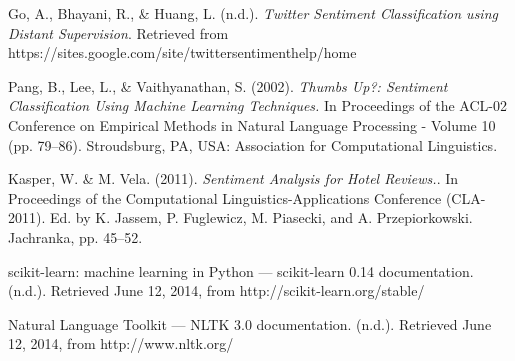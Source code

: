 \documentclass{article}
\begin{document}
\begin{thebibliography}{1}

Go, A., Bhayani, R., \& Huang, L. (n.d.). \textit{Twitter Sentiment Classification using Distant Supervision}. Retrieved from https://sites.google.com/site/twittersentimenthelp/home

Pang, B., Lee, L., \& Vaithyanathan, S. (2002). \textit{Thumbs Up?: Sentiment Classification Using Machine Learning Techniques.} In Proceedings of the ACL-02 Conference on Empirical Methods in Natural Language Processing - Volume 10 (pp. 79–86). Stroudsburg, PA, USA: Association for Computational Linguistics.

Kasper, W. \& M. Vela. (2011). \textit{Sentiment Analysis for Hotel Reviews.}. In Proceedings of the Computational Linguistics-Applications Conference (CLA-2011). Ed. by K. Jassem, P. Fuglewicz, M. Piasecki, and A. Przepiorkowski. Jachranka, pp. 45–52.

scikit-learn: machine learning in Python — scikit-learn 0.14 documentation. (n.d.). Retrieved June 12, 2014, from http://scikit-learn.org/stable/

Natural Language Toolkit — NLTK 3.0 documentation. (n.d.). Retrieved June 12, 2014, from http://www.nltk.org/


\end{thebibliography}
\end{document}
